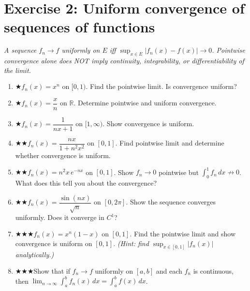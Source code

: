 \documentclass[12pt,a4paper]{article}
\newcommand{\easy}{{\color{green!60!black}$\bigstar$}}
\newcommand{\medium}{{\color{orange}$\bigstar\bigstar$}}
\newcommand{\hard}{{\color{red}$\bigstar\bigstar\bigstar$}}
\begin{document}
\section*{Exercise 2: Uniform convergence of sequences of functions}

\emph{A sequence $f_n \to f$ uniformly on $E$ iff $\sup_{x\in E}|f_n(x)-f(x)| \to 0$.
Pointwise convergence alone does NOT imply continuity, integrability, or differentiability of the limit.}

\begin{enumerate}[leftmargin=*, label=(\alph*)]

\item \easy\quad $f_n(x) = x^n$ on $[0,1)$. Find the pointwise limit. Is convergence uniform?

\item \easy\quad $f_n(x) = \dfrac{x}{n}$ on $\mathbb{R}$. Determine pointwise and uniform convergence.

\item \easy\quad $f_n(x) = \dfrac{1}{nx+1}$ on $[1,\infty)$. Show convergence is uniform.

\item \medium\quad $f_n(x) = \dfrac{nx}{1+n^2x^2}$ on $[0,1]$.
Find pointwise limit and determine whether convergence is uniform.

\item \medium\quad $f_n(x) = n^2 x\,e^{-nx}$ on $[0,1]$.
Show $f_n \to 0$ pointwise but $\int_0^1 f_n\,dx \not\to 0$.
What does this tell you about the convergence?

\item \medium\quad $f_n(x) = \dfrac{\sin(nx)}{\sqrt{n}}$ on $[0,2\pi]$.
Show the sequence converges uniformly. Does it converge in $C^1$?

\item \hard\quad $f_n(x) = x^n(1-x)$ on $[0,1]$.
Find the pointwise limit and show convergence is uniform on $[0,1]$.
\quad\emph{(Hint: find $\sup_{x\in[0,1]}|f_n(x)|$ analytically.)}

\item \hard\quad Show that if $f_n \to f$ uniformly on $[a,b]$ and each $f_n$ is continuous,
then $\displaystyle\lim_{n\to\infty}\int_a^b f_n(x)\,dx = \int_a^b f(x)\,dx$.

\end{enumerate}

\end{document}
